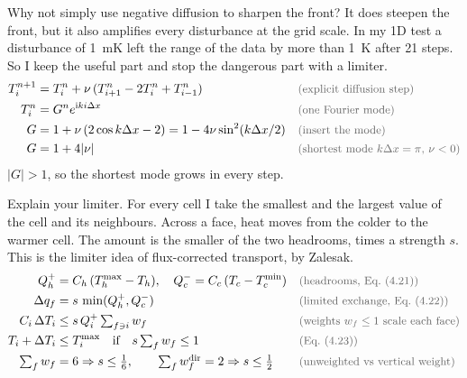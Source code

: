 \begin{qabox}{Why not simply use negative diffusion to sharpen the front?}
\explain It does steepen the front, but it also amplifies every disturbance at the grid scale. In my
1D test a disturbance of 1~mK left the range of the data by more than 1~K after 21 steps. So I keep
the useful part and stop the dangerous part with a limiter.
\derive
\begin{align*}
T_i^{n+1} &= T_i^n + \nu\,(T_{i+1}^n - 2T_i^n + T_{i-1}^n) \why{explicit diffusion step} \\
T_i^n &= G^n e^{\mathrm{i}k i\Delta x} \why{one Fourier mode} \\
G &= 1 + \nu\,(2\cos k\Delta x - 2) = 1 - 4\nu\sin^2(k\Delta x/2) \why{insert the mode} \\
G &= 1 + 4\lvert\nu\rvert \why{shortest mode $k\Delta x = \pi$, $\nu<0$}
\end{align*}
$\lvert G\rvert > 1$, so the shortest mode grows in every step.
\end{qabox}

\begin{qabox}{Explain your limiter.}
\explain For every cell I take the smallest and the largest value of the cell and its neighbours.
Across a face, heat moves from the colder to the warmer cell. The amount is the smaller of the two
headrooms, times a strength $s$. This is the limiter idea of flux-corrected transport, by Zalesak.
\derive
\begin{align*}
Q_h^{+} &= C_h\,(T_h^{\max} - T_h),\quad Q_c^{-} = C_c\,(T_c - T_c^{\min}) \why{headrooms, Eq.~(4.21)} \\
\Delta q_f &= s\,\min(Q_h^{+},Q_c^{-}) \why{limited exchange, Eq.~(4.22)} \\
C_i\,\Delta T_i &\le s\,Q_i^{+}\textstyle\sum_{f\ni i} w_f \why{weights $w_f\le1$ scale each face} \\
T_i + \Delta T_i &\le T_i^{\max} \quad\text{if}\quad s\textstyle\sum_f w_f \le 1 \why{Eq.~(4.23)} \\
\textstyle\sum_f w_f &= 6 \Rightarrow s\le\tfrac16,\qquad \textstyle\sum_f w^{\mathrm{dir}}_f = 2 \Rightarrow s\le\tfrac12 \why{unweighted vs vertical weight}
\end{align*}
\end{qabox}

